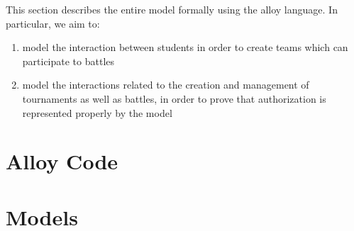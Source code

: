 This section describes the entire model formally using the alloy language.
In particular, we aim to:
\begin{enumerate}
      \item model the interaction between students
            in order to create teams which can participate to battles
      \item model the interactions related to the creation and management
            of tournaments as well as battles, in order to prove that
            authorization is represented properly by the model
\end{enumerate}

\section{Alloy Code}


\pagebreak
\section{Models}

